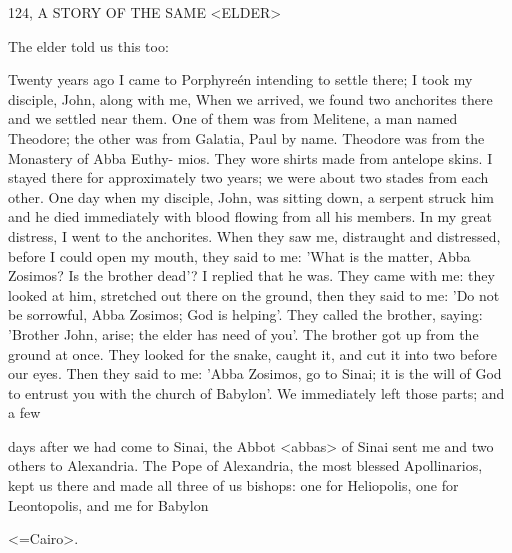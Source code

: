 124, A STORY OF THE SAME <ELDER>

The elder told us this too:

Twenty years ago I came to Porphyreén intending to settle there; I
took my disciple, John, along with me, When we arrived, we found
two anchorites there and we settled near them.
One of them was
from Melitene, a man named Theodore; the other was from Galatia,
Paul by name.
Theodore was from the Monastery of Abba Euthy-
mios.
They wore shirts made from antelope skins.
I stayed there for
approximately two years; we were about two stades from each
other.
One day when my disciple, John, was sitting down, a serpent
struck him and he died immediately with blood flowing from all his
members.
In my great distress, I went to the anchorites.
When they
saw me, distraught and distressed, before I could open my mouth,
they said to me: 'What is the matter, Abba Zosimos? Is the brother
dead'? I replied that he was.
They came with me: they looked at
him, stretched out there on the ground, then they said to me: 'Do
not be sorrowful, Abba Zosimos; God is helping'.
They called the
brother, saying: 'Brother John, arise; the elder has need of you'.
The
brother got up from the ground at once.
They looked for the snake,
caught it, and cut it into two before our eyes.
Then they said to me:
'Abba Zosimos, go to Sinai; it is the will of God to entrust you with
the church of Babylon'.
We immediately left those parts; and a few

days after we had come to Sinai, the Abbot <abbas> of Sinai sent
me and two others to Alexandria.
The Pope of Alexandria, the most
blessed Apollinarios, kept us there and made all three of us bishops:
one for Heliopolis, one for Leontopolis, and me for Babylon

<=Cairo>.

